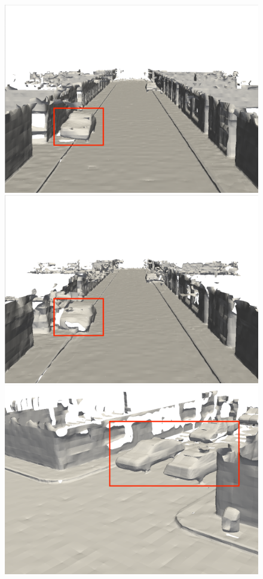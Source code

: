 \begin{figure}[htbp]
\begin{minipage}{0.5\linewidth}
    \includegraphics[width=1\linewidth]{figures/mai_1_vox.png}
\end{minipage}\hfill
\begin{minipage}{0.5\linewidth}
    \centering
    \includegraphics[width=1\linewidth]{figures/mai_1_bce.png}
\end{minipage}
\vfill
\begin{minipage}{0.5\linewidth}
    \centering
    \includegraphics[width=1\linewidth]{figures/mai_2_vox.png}

\end{minipage}
\end{figure}
